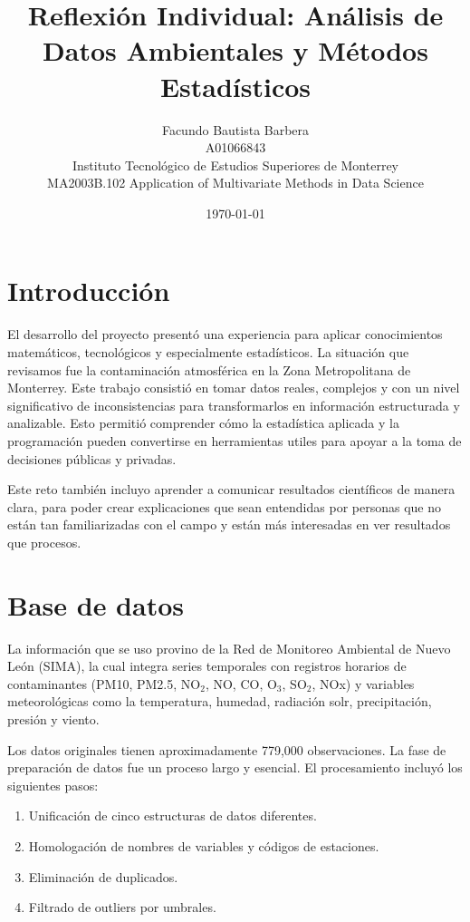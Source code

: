 \documentclass[11pt]{article}
\begin{document}
    \title{Reflexión Individual: Análisis de Datos Ambientales y Métodos Estadísticos}
    \author{Facundo Bautista Barbera \\ A01066843 \\ Instituto Tecnológico de Estudios Superiores de Monterrey \\ MA2003B.102 Application of Multivariate Methods in Data Science}
    \date{\today}
    \maketitle

    \section*{Introducción}
    El desarrollo del proyecto presentó una experiencia para aplicar conocimientos matemáticos, tecnológicos y especialmente estadísticos.
    La situación que revisamos fue la contaminación atmosférica en la Zona Metropolitana de Monterrey.
    Este trabajo consistió en tomar datos reales, complejos y con un nivel significativo de inconsistencias para transformarlos en información estructurada y analizable.
    Esto permitió comprender cómo la estadística aplicada y la programación pueden convertirse en herramientas utiles para apoyar a la toma de decisiones públicas y privadas.

    Este reto también incluyo aprender a comunicar resultados científicos de manera clara, para poder crear explicaciones que sean entendidas por personas que no están tan familiarizadas con el campo y están más interesadas en ver resultados que procesos.

    \section*{Base de datos}

    La información que se uso provino de la Red de Monitoreo Ambiental de Nuevo León (SIMA), la cual integra series temporales con registros horarios de contaminantes (PM10, PM2.5, NO$_2$, NO, CO, O$_3$, SO$_2$, NOx) y variables meteorológicas como la temperatura, humedad, radiación solr, precipitación, presión y viento.

    Los datos originales tienen aproximadamente 779,000 observaciones.
    La fase de preparación de datos fue un proceso largo y esencial.
    El procesamiento incluyó los siguientes pasos:
    \begin{enumerate}
        \item Unificación de cinco estructuras de datos diferentes.
        \item Homologación de nombres de variables y códigos de estaciones.
        \item Eliminación de duplicados.
        \item Filtrado de outliers por umbrales.
    \end{enumerate}
\end{document}
